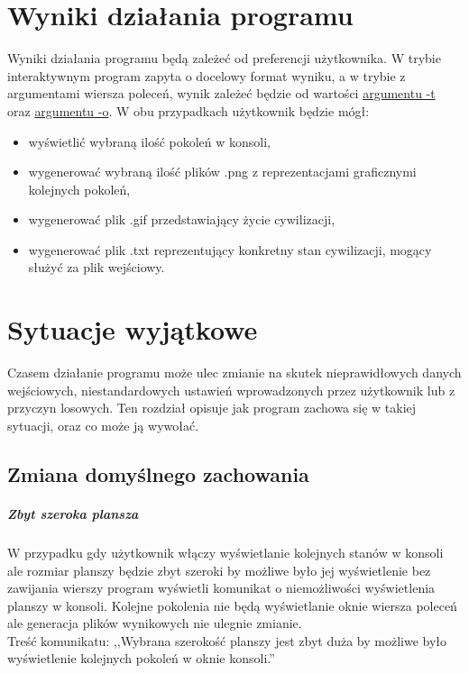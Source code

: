\documentclass{report}
\begin{document}
\chapter{Wyniki działania programu}
Wyniki działania programu będą zależeć od preferencji użytkownika. W trybie interaktywnym program zapyta o docelowy format wyniku, a w trybie z argumentami wiersza poleceń, wynik zależeć będzie od wartości \hyperref[argumenty]{\textcolor{LinkColor}{argumentu -t}} oraz \hyperref[argumenty]{\textcolor{LinkColor}{argumentu -o}}. W obu przypadkach użytkownik będzie mógł:
\begin{itemize}
\item wyświetlić wybraną ilość pokoleń w konsoli,
\item wygenerować wybraną ilość plików .png z reprezentacjami graficznymi kolejnych pokoleń,
\item wygenerować plik .gif przedstawiający życie cywilizacji,
\item wygenerować plik .txt reprezentujący konkretny stan cywilizacji, mogący służyć za plik wejściowy.
\end{itemize}

\chapter{Sytuacje wyjątkowe}
Czasem działanie programu może ulec zmianie na skutek nieprawidłowych danych wejściowych, niestandardowych ustawień wprowadzonych przez użytkownik lub z przyczyn losowych. Ten rozdział opisuje jak program zachowa się w takiej sytuacji, oraz co może ją wywołać.

\section{Zmiana domyślnego zachowania}
\paragraph{Zbyt szeroka plansza}
W przypadku gdy użytkownik włączy wyświetlanie kolejnych stanów w konsoli ale rozmiar planszy będzie zbyt szeroki by możliwe było jej wyświetlenie bez zawijania wierszy program wyświetli komunikat o niemożliwości wyświetlenia planszy w konsoli. Kolejne pokolenia nie będą wyświetlanie oknie wiersza poleceń ale generacja plików wynikowych nie ulegnie zmianie. \\
Treść komunikatu: ,,Wybrana szerokość planszy jest zbyt duża by możliwe było wyświetlenie kolejnych pokoleń w oknie konsoli.''
\end{document}
